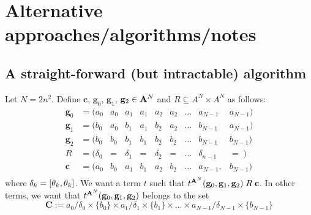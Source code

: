   

\newpage
  \appendix  
    
    \section{Alternative approaches/algorithms/notes}
    \subsection{A straight-forward (but intractable) algorithm}
    Let $N = 2n^2$.  Define $\mathbf{c}$, $\mathbf{g}_0$, $\mathbf{g}_1$, $\mathbf{g}_2 \in \mathbf{A}^{N}$ 
    and $R \subseteq A^{N}\times A^{N}$ as follows:
    \begin{equation}
    \begin{array}{cccccccccc}
      \mathbf{g}_0 &= (a_0 & a_0 &a_1 &a_1 &a_2 &a_2 & \dots & a_{N-1} & a_{N-1}) \\
      \mathbf{g}_1 &= (b_0 & a_0 &b_1 &a_1 &b_2 &a_2 & \dots & b_{N-1} & a_{N-1}) \\
      \mathbf{g}_2 &= (b_0 & b_0 &b_1 &b_1 &b_2 &b_2 & \dots & b_{N-1} & b_{N-1})\\[4pt]
        R  & = (\delta_0 & =  & \delta_1 & = & \delta_2 & = & \dots  & \delta_{n-1} & = \; )\\ [4pt]
      \mathbf{c}            & = (a_0     & b_0       & a_1      & b_1      & a_2      & b_2      & \dots  & a_{N-1}, & b_{N-1}) \\
    \end{array}
    \end{equation}
    where $\delta_k= [\theta_k, \theta_k]$.  We want a term $t$ such that $t^{\mathbf{A}^{N}}(\mathbf{g}_0, \mathbf{g}_1, \mathbf{g}_2)\mathrel{R} \mathbf{c}$.
    In other terms, we want that $t^{\mathbf{A}^{N}}(\mathbf{g}_0, \mathbf{g}_1, \mathbf{g}_2)$ belongs to the set
    \[
    \mathbf{C} := a_0/\delta_0 \times \{b_0\} \times a_1/\delta_1 \times \{b_1\} \times   \dots \times a_{N-1}/\delta_{N-1} \times \{b_{N-1}\}
    \]
    
